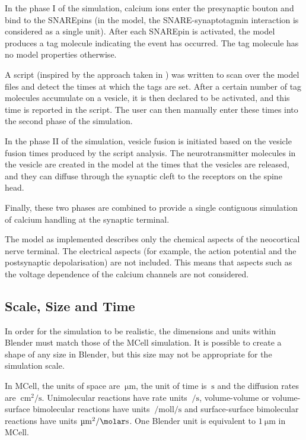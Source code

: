 \documentclass[a4paper]{article}
\begin{document}
In the phase I of the simulation, calcium ions enter the presynaptic bouton and bind to the SNAREpins (in the model, the SNARE-synaptotagmin interaction is considered as a single unit). After each SNAREpin is activated, the model produces a tag molecule indicating the event has occurred. The tag molecule has no model properties otherwise.

A script (inspired by the approach taken in \cite{ma2014quantitative}) was written to scan over the model files and detect the times at which the tags are set. After a certain number of tag molecules accumulate on a vesicle, it is then declared to be activated, and this time is reported in the script. The user can then manually enter these times into the second phase of the simulation.

In the phase II of the simulation, vesicle fusion is initiated based on the vesicle fusion times produced by the script analysis. The neurotransmitter molecules in the vesicle are created in the model at the times that the vesicles are released, and they can diffuse through the synaptic cleft to the receptors on the spine head.

Finally, these two phases are combined to provide a single contiguous simulation of calcium handling at the synaptic terminal.

The model as implemented describes only the chemical aspects of the neocortical nerve terminal. The electrical aspects (for example, the action potential and the postsynaptic depolarisation) are not included. This means that aspects such as the voltage dependence of the calcium channels are not considered.

\subsection{Scale, Size and Time}
In order for the simulation to be realistic, the dimensions and units within Blender must match those of the MCell simulation. It is possible to create a shape of any size in Blender, but this size may not be appropriate for the simulation scale.

In MCell, the units of space are $\SI{}{\micro\metre}$, the unit of time is $\SI{}{\second}$ and the diffusion rates are $\SI{}{\centi\metre\squared\per\second}$. Unimolecular reactions have rate units $\SI{}{\per\second}$, volume-volume or volume-surface bimolecular reactions have units $\SI{}{\per\mole\litre\per\second}$ and surface-surface bimolecular reactions have units $\SI{}{\micro\metre\squared\per\molar\second}$. One Blender unit is equivalent to $\SI{1}{\micro\metre}$ in MCell. 
\end{document}
